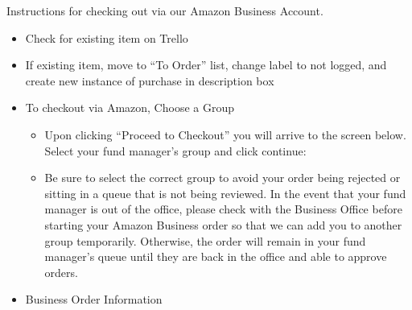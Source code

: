 \documentclass[]{book}
\providecommand{\tightlist}{%
  \setlength{\itemsep}{0pt}\setlength{\parskip}{0pt}}
\begin{document}
Instructions for checking out via our Amazon Business Account.

\begin{itemize}
\tightlist
\item
  Check for existing item on Trello
\item
  If existing item, move to ``To Order'' list, change label to not logged, and create new instance of purchase in description box
\item
  To checkout via Amazon, Choose a Group

  \begin{itemize}
  \tightlist
  \item
    Upon clicking ``Proceed to Checkout'' you will arrive to the screen below. Select your fund manager's group and click continue:
  \item
    Be sure to select the correct group to avoid your order being rejected or sitting in a queue that is not being reviewed. In the event that your fund manager is out of the office, please check with the Business Office before starting your Amazon Business order so that we can add you to another group temporarily. Otherwise, the order will remain in your fund manager's queue until they are back in the office and able to approve orders.
  \end{itemize}
\item
  Business Order Information


\end{itemize}
\end{document}
